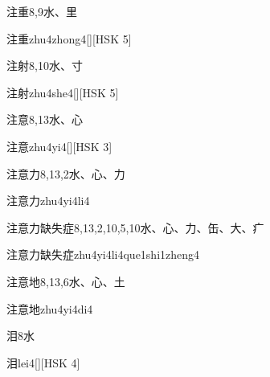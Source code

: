 \begin{Entry}{注重}{8,9}{⽔、⾥}
  \begin{Phonetics}{注重}{zhu4zhong4}[][HSK 5]
  \end{Phonetics}
\end{Entry}

\begin{Entry}{注射}{8,10}{⽔、⼨}
  \begin{Phonetics}{注射}{zhu4she4}[][HSK 5]
  \end{Phonetics}
\end{Entry}

\begin{Entry}{注意}{8,13}{⽔、⼼}
  \begin{Phonetics}{注意}{zhu4yi4}[][HSK 3]
  \end{Phonetics}
\end{Entry}

\begin{Entry}{注意力}{8,13,2}{⽔、⼼、⼒}
  \begin{Phonetics}{注意力}{zhu4yi4li4}
  \end{Phonetics}
\end{Entry}

\begin{Entry}{注意力缺失症}{8,13,2,10,5,10}{⽔、⼼、⼒、⽸、⼤、⽧}
  \begin{Phonetics}{注意力缺失症}{zhu4yi4li4que1shi1zheng4}
  \end{Phonetics}
\end{Entry}

\begin{Entry}{注意地}{8,13,6}{⽔、⼼、⼟}
  \begin{Phonetics}{注意地}{zhu4yi4di4}
  \end{Phonetics}
\end{Entry}

\begin{Entry}{泪}{8}{⽔}
  \begin{Phonetics}{泪}{lei4}[][HSK 4]
  \end{Phonetics}
\end{Entry}

